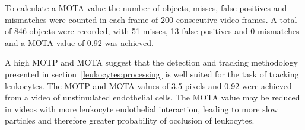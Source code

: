 To calculate a MOTA value the number of objects, misses, false positives and mismatches were counted in each frame of 200 consecutive video frames. A total of 846 objects were recorded, with 51 misses, 13 false positives and 0 mismatches and a MOTA value of 0.92 was achieved.

A high MOTP and MOTA suggest that the detection and tracking methodology presented in section~\ref{leukocytes:processing} is well suited for the task of tracking leukocytes. The MOTP and MOTA values of 3.5 pixels and 0.92 were achieved from a video of unstimulated endothelial cells. The MOTA value may be reduced in videos with more leukocyte endothelial interaction, leading to more slow particles and therefore greater probability of occlusion of leukocytes.
